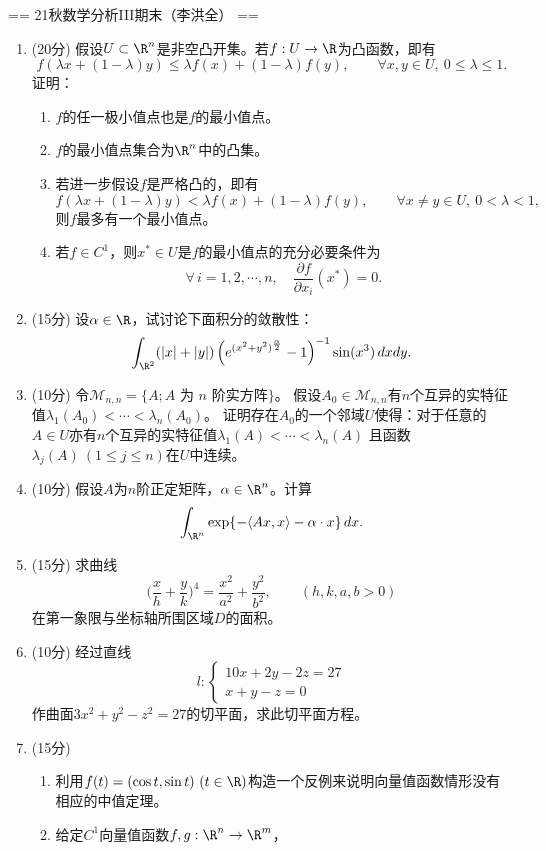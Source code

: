 == 21秋数学分析III期末（李洪全） ==
\begin{enumerate}
    \item[一] (20分) 假设$U\subset\R^n$是非空凸开集。若$f:U\to\R$为凸函数，即有
    \[f(\lambda x+(1-\lambda)y)\le\lambda f(x)+(1-\lambda)f(y),
    \qquad\forall x,y\in U,\ 0\le\lambda\le1.\]
    证明：\begin{enumerate}[label=(\roman*)]
    \item $f$的任一极小值点也是$f$的最小值点。
    \item $f$的最小值点集合为$\R^n$中的凸集。
    \item 若进一步假设$f$是严格凸的，即有
    \[f(\lambda x+(1-\lambda)y)<\lambda f(x)+(1-\lambda)f(y),
    \qquad\forall x \ne y\in U,\ 0<\lambda<1,\]
    则$f$最多有一个最小值点。
    \item 若$f\in C^1$，则$x^*\in U$是$f$的最小值点的充分必要条件为
    \[\forall\,i=1,2,\cdots,n,\quad\frac{\partial f}{\partial x_i}(x^*)=0.\]
    \end{enumerate}
    \item[二] (15分) 设$\alpha\in\R$，试讨论下面积分的敛散性：
    \[\int_{\R^2}(|x|+|y|)\left(e^{(x^2+y^2)^\frac{\alpha}{2}}-1\right)^{-1}\sin(x^3)\,dxdy.\]
    \item[三] (10分) 令$\mathcal{M}_{n,n}=\{A;A\text{ 为 }n\text{ 阶实方阵}\}$。
    假设$A_0\in\mathcal{M}_{n,n}$有$n$个互异的实特征值$\lambda_1(A_0)<\cdots<\lambda_n(A_0)$。
    证明存在$A_0$的一个邻域$U$使得：对于任意的$A\in U$亦有$n$个互异的实特征值$\lambda_1(A)<\cdots<\lambda_n(A)$
    且函数$\lambda_j(A)\ (1\le j\le n)$在$U$中连续。
    \item[四] (10分) 假设$A$为$n$阶正定矩阵，$\alpha\in\R^n$。计算
    \[\int_{\R^n}\exp\{-\langle Ax,x \rangle-\alpha\cdot x\}\,dx.\]
    \item[五] (15分) 求曲线\[\bigg(\frac{x}{h}+\frac{y}{k}\bigg)^4=
    \frac{x^2}{a^2}+\frac{y^2}{b^2},\qquad(h,k,a,b>0)\]
    在第一象限与坐标轴所围区域$D$的面积。
    \item[六] (10分) 经过直线\[l:\begin{cases}
        10x+2y-2z=27\\x+y-z=0
    \end{cases}\]作曲面$3x^2+y^2-z^2=27$的切平面，求此切平面方程。
    \item[七] (15分) \begin{enumerate}[label=(\arabic*)]
    \item 利用$f(t)=(\cos t,\sin t)\ (t\in\R)$构造一个反例来说明向量值函数情形没有相应的中值定理。
    \item 给定$C^1$向量值函数$f,g:\R^n\to\R^m$，

\end{enumerate}
\end{enumerate}
